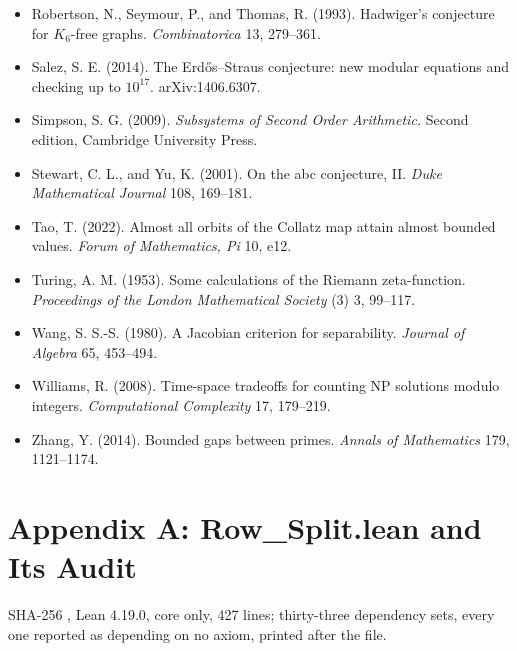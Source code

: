 \documentclass[10pt,twocolumn]{article}
\begin{document}
\begin{itemize}
  \(2996863034895 \cdot 2^{1290000} \pm 1\). primegrid.com, September
  2016.
\item
  Robertson, N., Seymour, P., and Thomas, R. (1993). Hadwiger's
  conjecture for \(K_6\)-free graphs. \emph{Combinatorica} 13, 279--361.
\item
  Salez, S. E. (2014). The Erdős--Straus conjecture: new modular
  equations and checking up to \(10^{17}\). arXiv:1406.6307.
\item
  Simpson, S. G. (2009). \emph{Subsystems of Second Order Arithmetic.}
  Second edition, Cambridge University Press.
\item
  Stewart, C. L., and Yu, K. (2001). On the abc conjecture, II.
  \emph{Duke Mathematical Journal} 108, 169--181.
\item
  Tao, T. (2022). Almost all orbits of the Collatz map attain almost
  bounded values. \emph{Forum of Mathematics, Pi} 10, e12.
\item
  Turing, A. M. (1953). Some calculations of the Riemann zeta-function.
  \emph{Proceedings of the London Mathematical Society} (3) 3, 99--117.
\item
  Wang, S. S.-S. (1980). A Jacobian criterion for separability.
  \emph{Journal of Algebra} 65, 453--494.
\item
  Williams, R. (2008). Time-space tradeoffs for counting NP solutions
  modulo integers. \emph{Computational Complexity} 17, 179--219.
\item
  Zhang, Y. (2014). Bounded gaps between primes. \emph{Annals of
  Mathematics} 179, 1121--1174.
\end{itemize}

\hypertarget{appendix-a-row_split.lean-and-its-audit}{%
\section{Appendix A: Row\_Split.lean and Its
Audit}\label{appendix-a-row_split.lean-and-its-audit}}

SHA-256
\texttt{},
Lean 4.19.0, core only, 427 lines; thirty-three dependency sets, every
one reported as depending on no axiom, printed after the file.

\begingroup\scriptsize
\end{document}
